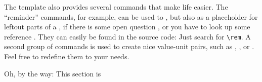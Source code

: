 
The template also provides several commands that make life easier. The ``reminder'' commands, for example, can be used to , but also as a placeholder for leftout parts of a \rem, if there is some open question \remq, or you have to look up some reference \remc. They can easily be found in the source code: Just search for \verb|\rem|. A second group of commands is used to create nice value-unit pairs, such as , , or . Feel free to redefine them to your needs.

\nxtpar\noindent
Oh, by the way: This section is \uc






